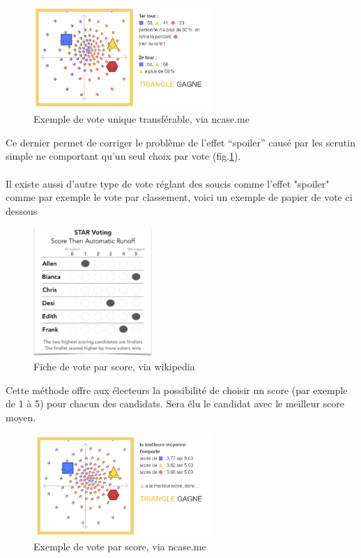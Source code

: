 \documentclass[11pt,a4paper]{report}
\begin{document}
\newpage
\begin{figure}[h]
	\centering
	\includegraphics[width=0.6\textwidth]{./images/vote-unique-tranferable.png}
	\caption{Exemple de vote unique transférable, via ncase.me \cite{ncase:ballot}}
	\label{sim:transfer}
\end{figure}

Ce dernier permet de corriger le problème de l’effet “spoiler” causé par les scrutin simple ne comportant qu’un seul choix par vote (fig.\ref{sim:transfer}).

\paragraph{}
Il existe aussi d'autre type de vote réglant des soucis comme l'effet "spoiler" comme par exemple le vote par classement, voici un exemple de papier de vote ci dessous

\begin{figure}[h]
	\centering
	\includegraphics[width=0.4\textwidth]{./images/star.png}
	\caption{Fiche de vote par score, via wikipedia \cite{wiki:scorevoting}}
	\label{sim:scores}
\end{figure}

Cette méthode offre aux électeurs la possibilité de choisir un score (par exemple de 1 à 5) pour chacun des candidats.
Sera élu le candidat avec le meilleur score moyen.

\newpage
\begin{figure}[h]
	\centering
	\includegraphics[width=0.6\textwidth]{./images/scores.png}
	\caption{Exemple de vote par score, via ncase.me \cite{ncase:ballot}}
	\label{sim:stars}
\end{figure}
\end{document}
